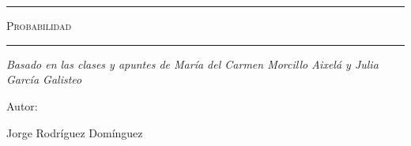 \begin{titlepage}
    \centering
    {\bfseries\LARGE \ \par}
    \vspace{1cm}
    {\scshape\Large \ \par}
    \vspace{3cm}
    \rule{\linewidth}{0.5mm}
    {\scshape\Huge Probabilidad \par}
    \rule{\linewidth}{0.5mm} \par
    \vspace{3cm}
    {\itshape\Large Basado en las clases y apuntes de María del Carmen Morcillo Aixelá y Julia García Galisteo \par}
    \vfill
    {\Large Autor: \par}
    {\Large Jorge Rodríguez Domínguez \par}
    \vfill
\end{titlepage}
\tableofcontents